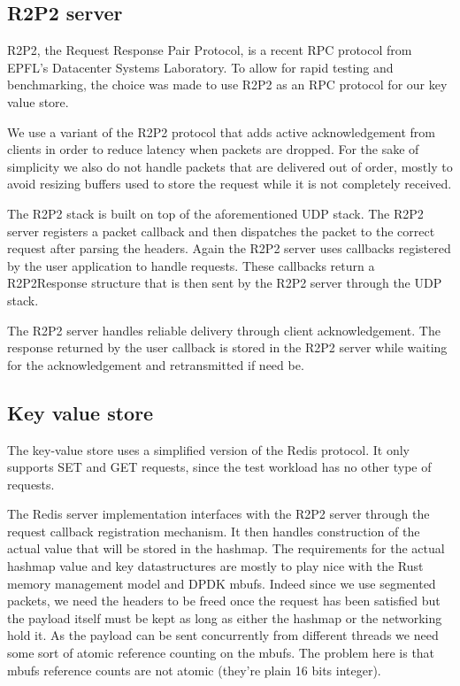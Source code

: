 \documentclass[11pt]{article}
\begin{document}
\subsection{R2P2 server}
R2P2, the Request Response Pair Protocol, is a recent RPC protocol
from EPFL's Datacenter Systems Laboratory. To allow for rapid testing
and benchmarking, the choice was made to use R2P2 as an RPC protocol
for our key value store.

We use a variant of the R2P2 protocol that adds active acknowledgement
from clients in order to reduce latency when packets are dropped. For
the sake of simplicity we also do not handle packets that are
delivered out of order, mostly to avoid resizing buffers used to store
the request while it is not completely received.

The R2P2 stack is built on top of the aforementioned UDP stack. The
R2P2 server registers a packet callback and then dispatches the packet
to the correct request after parsing the headers. Again the R2P2
server uses callbacks registered by the user application to handle
requests. These callbacks return a R2P2Response structure that is then
sent by the R2P2 server through the UDP stack.

The R2P2 server handles reliable delivery through client
acknowledgement. The response returned by the user callback is stored
in the R2P2 server while waiting for the acknowledgement and
retransmitted if need be.

\subsection{Key value store}

The key-value store uses a simplified version of the Redis
protocol. It only supports SET and GET requests, since the test
workload has no other type of requests.

The Redis server implementation interfaces with the R2P2 server through
the request callback registration mechanism. It then handles
construction of the actual value that will be stored in the
hashmap. The requirements for the actual hashmap value and key
datastructures are mostly to play nice with the Rust memory management
model and DPDK mbufs. Indeed since we use segmented packets, we need
the headers to be freed once the request has been satisfied but the
payload itself must be kept as long as either the hashmap or the
networking hold it. As the payload can be sent concurrently from
different threads we need some sort of atomic reference counting on
the mbufs. The problem here is that mbufs reference counts are not
atomic (they're plain 16 bits integer).
\end{document}

